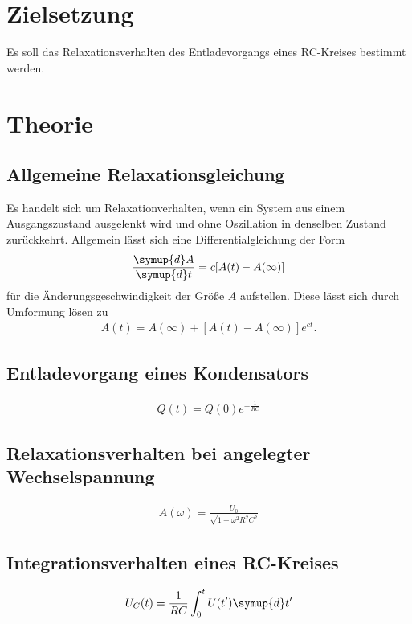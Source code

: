\section{Zielsetzung}
\label{sec:Zielsetzung}
Es soll das Relaxationsverhalten des Entladevorgangs eines RC-Kreises bestimmt werden.

\section{Theorie}
\label{sec:Theorie}

\subsection{Allgemeine Relaxationsgleichung}
\label{sec:AllgemeineRelaxationsgleichung}
Es handelt sich um Relaxationverhalten, wenn ein System aus einem Ausgangszustand ausgelenkt wird und ohne Oszillation in denselben
Zustand zurückkehrt. Allgemein lässt sich eine Differentialgleichung der Form
\begin{align}
    \label{eqn:dA/dt}
    \frac{\symup{d}A}{\symup{d}t} = c[A(t)-A(\infty)]
\end{align}
für die Änderungsgeschwindigkeit der Größe $A$ aufstellen. Diese lässt sich durch Umformung lösen zu
\begin{align}
    \label{eqn:AllgemeineRelaxationsgleichung}
    A(t)=A(\infty)+[A(t)-A(\infty)]e^{ct}.
\end{align}

\subsection{Entladevorgang eines Kondensators}
\label{sec:EntladekurveeinesKondensators}
\begin{align}
    \label{eqn:Entladung}
    Q(t)=Q(0)e^{-\frac{1}{RC}}
\end{align}

\subsection{Relaxationsverhalten bei angelegter Wechselspannung}
\label{sec:RelaxationsverhaltenbeiangelegterWechselspannung}
\begin{align}
    \label{eqn:Amplitude}
    A(\omega)=\frac{U_0}{\sqrt{1+\omega^2 R^2 C^2}}
\end{align}

\subsection{Integrationsverhalten eines RC-Kreises}
\label{sec:IntegrationsverhalteneinesRC-Kreises}
\begin{align}
    \label{eqn:Kondensatorspannung}
    U_{C}(t)=\frac{1}{RC}\int_{0}^{t} U(t')\symup{d}t'
\end{align}

\cite{sample}
